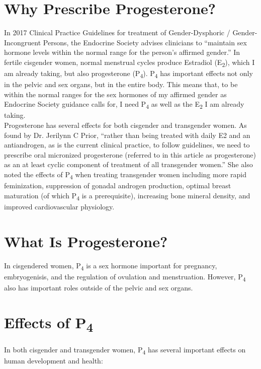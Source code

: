 \documentclass[
	secnumdepth=3, %
]{kaohandt}
\newcommand\tsub[1]{\textsubscript{#1}}
\begin{document}
\section{Why Prescribe Progesterone?}
In 2017 Clinical Practice Guidelines for treatment of Gender-Dysphoric / Gender-Incongruent Persons, the Endocrine Society advises clinicians to ``maintain sex hormone levels within the normal range for the person's affirmed gender.'' In fertile cisgender women, normal menstrual cycles produce Estradiol (E\tsub{2}), which I am already taking, but also progesterone (P\tsub{4}). P\tsub{4} has important effects not only in the pelvic and sex organs, but in the entire body. This means that, to be within the normal ranges for the sex hormones of my affirmed gender as Endocrine Society guidance calls for, I need P\tsub{4} as well as the E\tsub{2} I am already taking.\\

\noindent Progesterone has several effects for both cisgender and transgender women. As found by Dr. Jerilynn C Prior, ``rather than being treated with daily E2 and an antiandrogen, as is the current clinical practice, to follow guidelines, we need to prescribe oral micronized progesterone (referred to in this article as progesterone) as an at least cyclic component of treatment of all transgender women.'' She also noted the effects of P\tsub{4} when treating transgender women including more rapid feminization, suppression of gonadal androgen production, optimal breast maturation (of which P\tsub{4} is a prerequisite), increasing bone mineral density, and improved cardiovascular physiology.

\section{What Is Progesterone?}

In cisgendered women, P\tsub{4} is a sex hormone important for pregnancy, embryogenisis, and the regulation of ovulation and menstruation. However, P\tsub{4} also has important roles outside of the pelvic and sex organs.

\section{Effects of P\tsub{4}}
In both cisgender and transgender women, P\tsub{4} has several important effects on human development and health:
\end{document}

